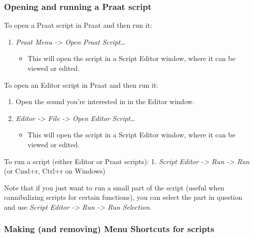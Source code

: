 \documentclass[11pt]{article}
\def\tightlist{}
\begin{document}
\hypertarget{opening-and-running-a-praat-script}{%
\subsubsection{Opening and running a Praat
script}\label{opening-and-running-a-praat-script}}

To open a Praat script in Praat and then run it:

\begin{enumerate}
\def\labelenumi{\arabic{enumi}.}
\tightlist
\item
  \emph{Praat Menu -\textgreater{} Open Praat Script\ldots{}}

  \begin{itemize}
  \tightlist
  \item
    This will open the script in a Script Editor window, where it can be
    viewed or edited.
  \end{itemize}
\end{enumerate}

To open an Editor script in Praat and then run it:

\begin{enumerate}
\def\labelenumi{\arabic{enumi}.}
\tightlist
\item
  Open the sound you're interested in in the Editor window.
\item
  \emph{Editor -\textgreater{} File -\textgreater{} Open Editor
  Script\ldots{}}

  \begin{itemize}
  \tightlist
  \item
    This will open the script in a Script Editor window, where it can be
    viewed or edited.
  \end{itemize}
\end{enumerate}

To run a script (either Editor or Praat scripts): 1. \emph{Script Editor
-\textgreater{} Run -\textgreater{} Run} (or Cmd+r, Ctrl+r on Windows)

Note that if you just want to run a small part of the script (useful
when cannibalizing scripts for certain functions), you can select the
part in question and use \emph{Script Editor -\textgreater{} Run
-\textgreater{} Run Selection}.

\hypertarget{making-and-removing-menu-shortcuts-for-scripts}{%
\subsubsection{Making (and removing) Menu Shortcuts for
scripts}\label{making-and-removing-menu-shortcuts-for-scripts}}
\end{document}
